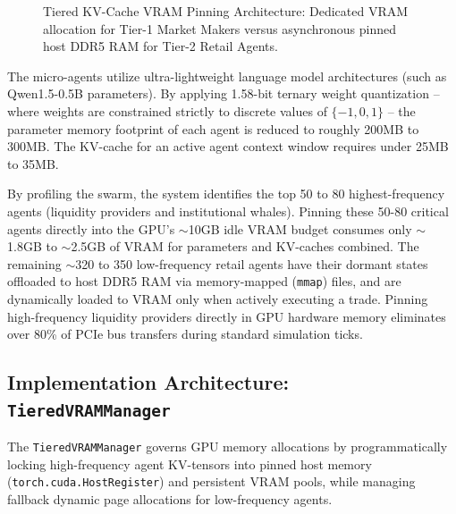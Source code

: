 \begin{figure}[htbp]
\caption{Tiered KV-Cache VRAM Pinning Architecture: Dedicated VRAM allocation for Tier-1 Market Makers versus asynchronous pinned host DDR5 RAM for Tier-2 Retail Agents.}
\label{fig:tiered_vram}
\end{figure}

The micro-agents utilize ultra-lightweight language model architectures (such as Qwen1.5-0.5B parameters). By applying 1.58-bit ternary weight quantization -- where weights are constrained strictly to discrete values of $\{-1, 0, 1\}$ -- the parameter memory footprint of each agent is reduced to roughly 200MB to 300MB. The KV-cache for an active agent context window requires under 25MB to 35MB.

By profiling the swarm, the system identifies the top 50 to 80 highest-frequency agents (liquidity providers and institutional whales). Pinning these 50-80 critical agents directly into the GPU's $\sim$10GB idle VRAM budget consumes only $\sim$1.8GB to $\sim$2.5GB of VRAM for parameters and KV-caches combined. The remaining $\sim$320 to 350 low-frequency retail agents have their dormant states offloaded to host DDR5 RAM via memory-mapped (\texttt{mmap}) files, and are dynamically loaded to VRAM only when actively executing a trade. Pinning high-frequency liquidity providers directly in GPU hardware memory eliminates over 80\% of PCIe bus transfers during standard simulation ticks.

\subsection{Implementation Architecture: \texttt{TieredVRAMManager}}

The \texttt{TieredVRAMManager} governs GPU memory allocations by programmatically locking high-frequency agent KV-tensors into pinned host memory (\texttt{torch.cuda.HostRegister}) and persistent VRAM pools, while managing fallback dynamic page allocations for low-frequency agents.

